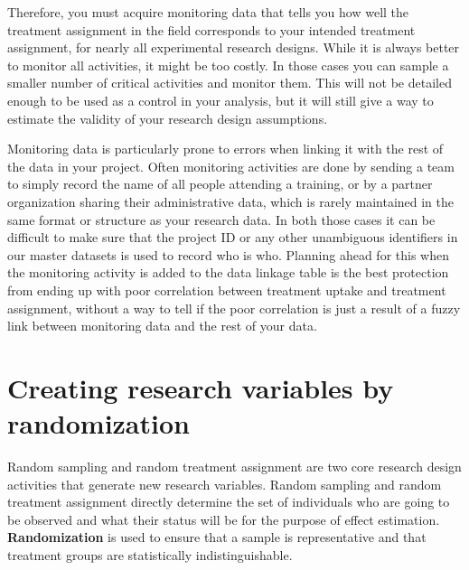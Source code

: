 Therefore, you must acquire monitoring data that
tells you how well the treatment assignment in the field
corresponds to your intended treatment assignment,
for nearly all experimental research designs.
While it is always better to monitor all activities,
it might be too costly.
In those cases you can sample a smaller number of critical activities and monitor them.
This will not be detailed enough to be used as a control in your analysis,
but it will still give a way to
estimate the validity of your research design assumptions.

Monitoring data is particularly prone to errors
when linking it with the rest of the data in your project.
Often monitoring activities are done by
sending a team to simply record the name of all people attending a training,
or by a partner organization sharing their administrative data,
which is rarely maintained in the same format or structure as your research data.
In both those cases it can be difficult to make sure that
the project ID or any other unambiguous identifiers in our master datasets
is used to record who is who.
Planning ahead for this when the monitoring activity is added to the data linkage table
is the best protection from ending up with poor correlation
between treatment uptake and treatment assignment,
without a way to tell if the poor correlation is just
a result of a fuzzy link between monitoring data and the rest of your data.

\section{Creating research variables by randomization}

Random sampling and random treatment assignment 
are two core research design activities
that generate new research variables.
Random sampling and random treatment assignment directly determine
the set of individuals who are going to be observed
and what their status will be for the purpose of effect estimation.
\textbf{Randomization}
is used to ensure that a sample is representative and
that treatment groups are statistically indistinguishable.

